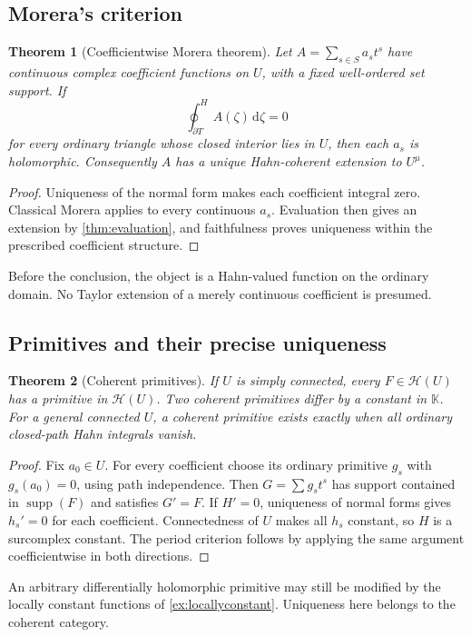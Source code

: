 \documentclass[11pt,oneside]{article}
\numberwithin{equation}{section}
\newtheorem{theorem}{Theorem}[section]
\theoremstyle{definition}
\theoremstyle{remark}\newtheorem{remark}[theorem]{Remark}
\newcommand{\K}{\mathbb K}
\newcommand{\HH}{\mathscr H}
\newcommand{\supp}{\operatorname{supp}}
\newcommand{\hoint}{\mathop{\oint}\nolimits^{\!H}}
\newcommand{\dd}{\,\mathrm d}
\begin{document}
\subsection{Morera's criterion}
\begin{theorem}[Coefficientwise Morera theorem]\label{thm:morera}
Let $A=\sum_{s\in S}a_s t^s$ have continuous complex coefficient functions
on $U$, with a fixed well-ordered set support. If
\[
 \hoint_{\partial T} A(\zeta)\dd\zeta=0
\]
for every ordinary triangle whose closed interior lies in $U$, then each
$a_s$ is holomorphic. Consequently $A$ has a unique Hahn-coherent extension
to $U^\mu$.
\end{theorem}
\begin{proof}
Uniqueness of the normal form makes each coefficient integral zero.
Classical Morera applies to every continuous $a_s$. Evaluation then gives
an extension by \cref{thm:evaluation}, and faithfulness proves uniqueness
within the prescribed coefficient structure.
\end{proof}
Before the conclusion, the object is a Hahn-valued function on the ordinary
domain. No Taylor extension of a merely continuous coefficient is presumed.

\subsection{Primitives and their precise uniqueness}
\begin{theorem}[Coherent primitives]\label{thm:primitives}
If $U$ is simply connected, every $F\in\HH(U)$ has a primitive in
$\HH(U)$. Two coherent primitives differ by a constant in $\K$.
For a general connected $U$, a coherent primitive exists exactly when
all ordinary closed-path Hahn integrals vanish.
\end{theorem}
\begin{proof}
Fix $a_0\in U$. For every coefficient choose its ordinary primitive
$g_s$ with $g_s(a_0)=0$, using path independence. Then $G=\sum g_s t^s$
has support contained in $\supp(F)$ and satisfies $G'=F$.
If $H'=0$, uniqueness of normal forms gives $h_s'=0$ for each coefficient.
Connectedness of $U$ makes all $h_s$ constant, so $H$ is a surcomplex
constant. The period criterion follows by applying the same argument
coefficientwise in both directions.
\end{proof}
An arbitrary differentially holomorphic primitive may still be modified
by the locally constant functions of \cref{ex:locallyconstant}. Uniqueness
here belongs to the coherent category.
\end{document}
